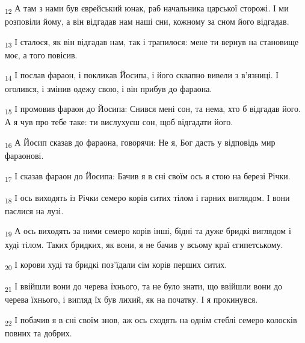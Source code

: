 \begin{tcolorbox}
\textsubscript{12} А там з нами був єврейський юнак, раб начальника царської сторожі. І ми розповіли йому, а він відгадав нам наші сни, кожному за сном його відгадав.
\end{tcolorbox}
\begin{tcolorbox}
\textsubscript{13} І сталося, як він відгадав нам, так і трапилося: мене ти вернув на становище моє, а того повісив.
\end{tcolorbox}
\begin{tcolorbox}
\textsubscript{14} І послав фараон, і покликав Йосипа, і його сквапно вивели з в'язниці. І оголився, і змінив одежу свою, і він прибув до фараона.
\end{tcolorbox}
\begin{tcolorbox}
\textsubscript{15} І промовив фараон до Йосипа: Снився мені сон, та нема, хто б відгадав його. А я чув про тебе таке: ти вислухуєш сон, щоб відгадати його.
\end{tcolorbox}
\begin{tcolorbox}
\textsubscript{16} А Йосип сказав до фараона, говорячи: Не я, Бог дасть у відповідь мир фараонові.
\end{tcolorbox}
\begin{tcolorbox}
\textsubscript{17} І сказав фараон до Йосипа: Бачив я в сні своїм ось я стою на березі Річки.
\end{tcolorbox}
\begin{tcolorbox}
\textsubscript{18} І ось виходять із Річки семеро корів ситих тілом і гарних виглядом. І вони паслися на лузі.
\end{tcolorbox}
\begin{tcolorbox}
\textsubscript{19} А ось виходять за ними семеро корів інші, бідні та дуже бридкі виглядом і худі тілом. Таких бридких, як вони, я не бачив у всьому краї єгипетському.
\end{tcolorbox}
\begin{tcolorbox}
\textsubscript{20} І корови худі та бридкі поз'їдали сім корів перших ситих.
\end{tcolorbox}
\begin{tcolorbox}
\textsubscript{21} І ввійшли вони до черева їхнього, та не було знати, що ввійшли вони до черева їхнього, і вигляд їх був лихий, як на початку. І я прокинувся.
\end{tcolorbox}
\begin{tcolorbox}
\textsubscript{22} І побачив я в сні своїм знов, аж ось сходять на однім стеблі семеро колосків повних та добрих.
\end{tcolorbox}
